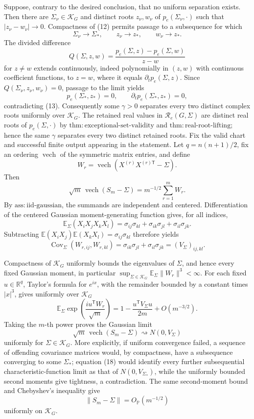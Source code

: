 Suppose, contrary to the desired conclusion, that no uniform separation exists.  Then there are \(\Sigma_\nu\in\mathcal K_G\) and distinct roots \(z_\nu,w_\nu\) of \(p_e(\Sigma_\nu,\cdot)\) such that \(|z_\nu-w_\nu|\to0\).  Compactness of (12) permits passage to a subsequence for which
\[
 \Sigma_\nu\to\Sigma_*,\qquad z_\nu\to z_*,\qquad w_\nu\to z_*.
\]
The divided difference
\[
 Q(\Sigma,z,w)
 =\frac{p_e(\Sigma,z)-p_e(\Sigma,w)}{z-w}
\tag{14}
\]
for \(z\ne w\) extends continuously, indeed polynomially in \((z,w)\) with continuous coefficient functions, to \(z=w\), where it equals \(\partial_t p_e(\Sigma,z)\).  Since \(Q(\Sigma_\nu,z_\nu,w_\nu)=0\), passage to the limit yields
\[
 p_e(\Sigma_*,z_*)=0,
 \qquad
 \partial_t p_e(\Sigma_*,z_*)=0,
\]
contradicting (13).  Consequently some \(\gamma>0\) separates every two distinct complex roots uniformly over \(\mathcal K_G\).  The retained real values in \(\mathcal R_e(G,\Sigma)\) are distinct real roots of \(p_e(\Sigma,\cdot)\) by \(\mathrm{thm:exceptional\mbox{-}set\mbox{-}validity}\) and \(\mathrm{thm:real\mbox{-}root\mbox{-}lifting}\); hence the same \(\gamma\) separates every two distinct retained roots.
Fix the valid chart and successful finite output appearing in the statement.  Let \(q=n(n+1)/2\), fix an ordering \(\operatorname{vech}\) of the symmetric matrix entries, and define
\[
 W_r=\operatorname{vech}\!\left(X^{(r)}X^{(r)\mathsf T}-\Sigma\right).
\]
Then
\[
 \sqrt m\,\operatorname{vech}(S_m-\Sigma)
 =m^{-1/2}\sum_{r=1}^m W_r.
\tag{15}
\]
By \(\mathrm{ass:iid\mbox{-}gaussian}\), the summands are independent and centered.  Differentiation of the centered Gaussian moment-generating function gives, for all indices,
\[
 \mathbb E_\Sigma(X_iX_jX_kX_l)
 =\sigma_{ij}\sigma_{kl}+\sigma_{ik}\sigma_{jl}+\sigma_{il}\sigma_{jk}.
\tag{16}
\]
Subtracting \(\mathbb E(X_iX_j)\mathbb E(X_kX_l)=\sigma_{ij}\sigma_{kl}\) therefore yields
\[
 \operatorname{Cov}_\Sigma(W_{r,ij},W_{r,kl})
 =\sigma_{ik}\sigma_{jl}+\sigma_{il}\sigma_{jk}
 =(V_\Sigma)_{ij,kl}.
\tag{17}
\]

Compactness of \(\mathcal K_G\) uniformly bounds the eigenvalues of \(\Sigma\), and hence every fixed Gaussian moment, in particular \(\sup_{\Sigma\in\mathcal K_G}\mathbb E_\Sigma\|W_r\|^3<\infty\).  For each fixed \(u\in\mathbb R^q\), Taylor's formula for \(e^{ix}\), with the remainder bounded by a constant times \(|x|^3\), gives uniformly over \(\mathcal K_G\)
\[
 \mathbb E_\Sigma\exp\!\left(\frac{i u^{\mathsf T}W_r}{\sqrt m}\right)
 =1-\frac{u^{\mathsf T}V_\Sigma u}{2m}+O(m^{-3/2}).
\tag{18}
\]
Taking the \(m\)-th power proves the Gaussian limit
\[
 \sqrt m\,\operatorname{vech}(S_m-\Sigma)
 \rightsquigarrow N(0,V_\Sigma)
\tag{19}
\]
uniformly for \(\Sigma\in\mathcal K_G\).  More explicitly, if uniform convergence failed, a sequence of offending covariance matrices would, by compactness, have a subsequence converging to some \(\Sigma_*\); equation (18) would identify every further subsequential characteristic-function limit as that of \(N(0,V_{\Sigma_*})\), while the uniformly bounded second moments give tightness, a contradiction.  The same second-moment bound and Chebyshev's inequality give
\[
 \|S_m-\Sigma\|=O_{\mathbb P}(m^{-1/2})
\tag{20}
\]
uniformly on \(\mathcal K_G\).

